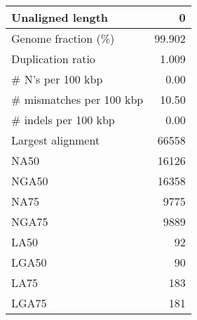 \documentclass[12pt,a4paper]{article}
\begin{document}
\begin{table}[ht]
\begin{center}
\begin{tabular}{|l*{1}{|r}|}
Unaligned length & 0 \\ \hline
Genome fraction (\%) & 99.902 \\ \hline
Duplication ratio & 1.009 \\ \hline
\# N's per 100 kbp & 0.00 \\ \hline
\# mismatches per 100 kbp & 10.50 \\ \hline
\# indels per 100 kbp & 0.00 \\ \hline
Largest alignment & 66558 \\ \hline
NA50 & 16126 \\ \hline
NGA50 & 16358 \\ \hline
NA75 & 9775 \\ \hline
NGA75 & 9889 \\ \hline
LA50 & 92 \\ \hline
LGA50 & 90 \\ \hline
LA75 & 183 \\ \hline
LGA75 & 181 \\ \hline
\end{tabular}
\end{center}
\end{table}
\end{document}
